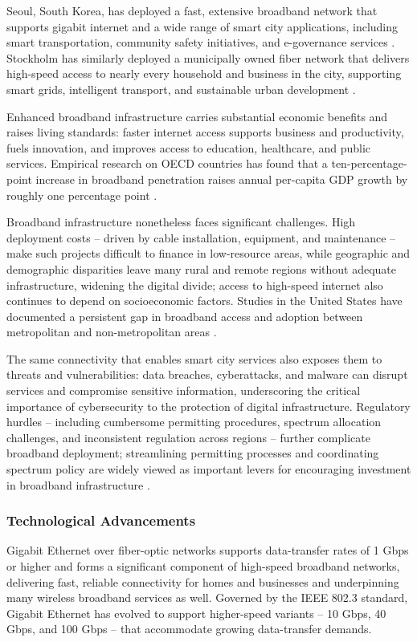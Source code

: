 \documentclass[journal]{IEEEtran}
\begin{document}
Seoul, South Korea, has deployed a fast, extensive broadband network that supports gigabit internet and a wide range of smart city applications, including smart transportation, community safety initiatives, and e-governance services \cite{r27}. Stockholm has similarly deployed a municipally owned fiber network that delivers high-speed access to nearly every household and business in the city, supporting smart grids, intelligent transport, and sustainable urban development \cite{r28}.

Enhanced broadband infrastructure carries substantial economic benefits and raises living standards: faster internet access supports business and productivity, fuels innovation, and improves access to education, healthcare, and public services. Empirical research on OECD countries has found that a ten-percentage-point increase in broadband penetration raises annual per-capita GDP growth by roughly one percentage point \cite{r29}.

Broadband infrastructure nonetheless faces significant challenges. High deployment costs -- driven by cable installation, equipment, and maintenance -- make such projects difficult to finance in low-resource areas, while geographic and demographic disparities leave many rural and remote regions without adequate infrastructure, widening the digital divide; access to high-speed internet also continues to depend on socioeconomic factors. Studies in the United States have documented a persistent gap in broadband access and adoption between metropolitan and non-metropolitan areas \cite{r31}.

The same connectivity that enables smart city services also exposes them to threats and vulnerabilities: data breaches, cyberattacks, and malware can disrupt services and compromise sensitive information, underscoring the critical importance of cybersecurity to the protection of digital infrastructure. Regulatory hurdles -- including cumbersome permitting procedures, spectrum allocation challenges, and inconsistent regulation across regions -- further complicate broadband deployment; streamlining permitting processes and coordinating spectrum policy are widely viewed as important levers for encouraging investment in broadband infrastructure \cite{r30}.

\subsubsection{Technological Advancements}
Gigabit Ethernet over fiber-optic networks supports data-transfer rates of 1 Gbps or higher and forms a significant component of high-speed broadband networks, delivering fast, reliable connectivity for homes and businesses and underpinning many wireless broadband services as well. Governed by the IEEE 802.3 standard, Gigabit Ethernet has evolved to support higher-speed variants -- 10 Gbps, 40 Gbps, and 100 Gbps -- that accommodate growing data-transfer demands.
\end{document}
